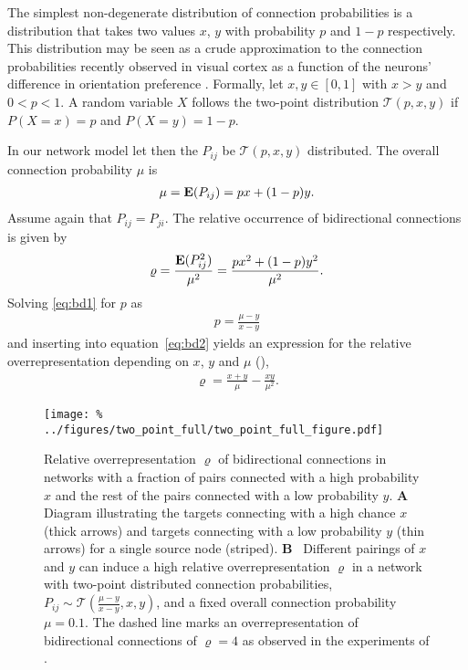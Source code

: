 
The simplest non-degenerate distribution of connection probabilities
is a distribution that takes two values $x$, $y$ with probability $p$
and $1-p$ respectively. %
%
This distribution may be seen as a crude approximation to the
connection probabilities recently observed in visual cortex as a
function of the neurons' difference in orientation preference
\cite{Lee2016}.
%
Formally, let $x,y \in [0,1]$ with $x > y$ and $0 < p
< 1$. A random variable $X$ follows the two-point distribution 
$\mathcal{T}(p,x,y)$ if $P(X=x)=p$ and $P(X=y) = 1-p$.
%

%
In our network model let then the $P_{ij}$ be $\mathcal{T}(p,x,y)$
distributed. The overall connection probability $\mu$ is
\begin{align}
\mu = \operatorname{\mathbf{E}}(P_{ij}) = px + (1-p)y. \label{eq:bd1}
\end{align}
Assume again that $P_{ij} = P_{ji}$. The relative occurrence of
bidirectional connections is given by
\begin{align}
  \varrho = \frac{\operatorname{\mathbf{E}}(P_{ij}^2)}{\mu^2} = \frac{p x^2 + (1-p) y^2}{\mu^2} \label{eq:bd2}.
\end{align}
Solving \eqref{eq:bd1} for $p$ as
\begin{align}
p = \frac{\mu - y}{x-y}
\end{align}
and inserting into
equation~\eqref{eq:bd2} yields an expression for the relative
overrepresentation depending on $x$, $y$ and $\mu$ (),
\begin{align}
\varrho = \frac{x+y}{\mu} - \frac{xy}{\mu^2}.
\end{align}

\begin{figure}[h!]
\centering
\texttt{[image: \%
  ../figures/two\_point\_full/two\_point\_full\_figure.pdf]}
\caption{Relative overrepresentation $\varrho$ of bidirectional
  connections in networks with a fraction of pairs connected with a
  high probability $x$ and the rest of the pairs connected with a low
  probability $y$. \textbf{A}~ Diagram illustrating the targets
  connecting with a high chance $x$ (thick arrows) and targets
  connecting with a low probability $y$ (thin arrows) for a single
  source node (striped). \textbf{B}~ Different pairings of $x$ and $y$
  can induce a high relative overrepresentation $\varrho$ in a network
  with two-point distributed connection probabilities, $P_{ij} \sim
  \mathcal{T}(\frac{\mu-y}{x-y},x,y)$, and a fixed overall connection
  probability $\mu = 0.1$. The dashed line marks an overrepresentation
  of bidirectional connections of $\varrho=4$ as observed in the
  experiments of \textcite{Song2005}.}
\label{fig:tp}
\end{figure}

